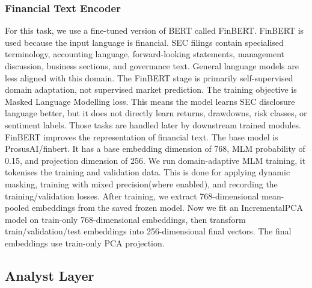 \documentclass[conference]{IEEEtran}
\begin{document}
\subsubsection{Financial Text Encoder}
For this task, we use a fine-tuned version of BERT called FinBERT.\cite{FinBERT} FinBERT is used because the input language is financial. SEC filings contain specialised terminology, accounting language, forward-looking statements, management discussion, business sections, and governance text. General language models are less aligned with this domain. The FinBERT stage is primarily self-supervised domain adaptation, not supervised market prediction. The training objective is Masked Language Modelling loss. This means the model learns SEC disclosure language better, but it does not directly learn returns, drawdowns, risk classes, or sentiment labels. Those tasks are handled later by downstream trained modules. FinBERT improves the representation of financial text. The base model is ProsusAI/finbert.\cite{FinBERTModel} It has a base embedding dimension of 768, MLM probability of 0.15, and projection dimension of 256. We run domain-adaptive MLM training, it tokenises the training and validation data. This is done for applying dynamic masking, training with mixed precision(where enabled), and recording the training/validation losses. After training, we extract 768-dimensional mean-pooled embeddings from the saved frozen model. Now we fit an IncrementalPCA\cite{IncrementalPCA} model on train-only 768-dimensional embeddings, then transform train/validation/test embeddings into 256-dimensional final vectors. The final embeddings use train-only PCA projection.
\subsection{Analyst Layer}
\end{document}
